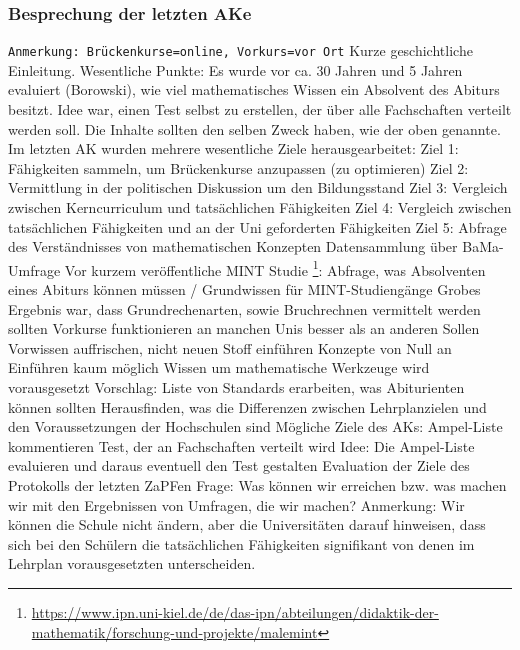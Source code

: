 \subsubsection*{Besprechung der letzten AKe}
\begin{outline}
\1 \texttt{Anmerkung: Brückenkurse=online, Vorkurs=vor Ort}
\1 Kurze geschichtliche Einleitung. Wesentliche Punkte:
\2 Es wurde vor ca. 30 Jahren und 5 Jahren evaluiert (Borowski), wie viel mathematisches Wissen ein Absolvent des Abiturs besitzt.
\2 Idee war, einen Test selbst zu erstellen, der über alle Fachschaften verteilt werden soll. Die Inhalte sollten den selben Zweck haben, wie der oben genannte.
\2 Im letzten AK wurden mehrere wesentliche Ziele herausgearbeitet:
\3 Ziel 1: Fähigkeiten sammeln, um Brückenkurse anzupassen (zu optimieren)
\3 Ziel 2: Vermittlung in der politischen Diskussion um den Bildungsstand
\3 Ziel 3: Vergleich zwischen Kerncurriculum und tatsächlichen Fähigkeiten
\3 Ziel 4: Vergleich zwischen tatsächlichen Fähigkeiten und an der Uni geforderten Fähigkeiten
\3 Ziel 5: Abfrage des Verständnisses von mathematischen Konzepten
\1 Datensammlung über BaMa-Umfrage
				\1 Vor kurzem veröffentliche MINT Studie \footnote{\url{https://www.ipn.uni-kiel.de/de/das-ipn/abteilungen/didaktik-der-mathematik/forschung-und-projekte/malemint}}:
					\2 Abfrage, was Absolventen eines Abiturs können müssen / Grundwissen für MINT-Studiengänge
					\2 Grobes Ergebnis war, dass Grundrechenarten, sowie Bruchrechnen vermittelt werden sollten
				\1 Vorkurse funktionieren an manchen Unis besser als an anderen
					\2 Sollen Vorwissen auffrischen, nicht neuen Stoff einführen
					\2 Konzepte von Null an Einführen kaum möglich
					\2 Wissen um mathematische Werkzeuge wird vorausgesetzt
				\1 Vorschlag: Liste von Standards erarbeiten, was Abiturienten können sollten
				\1 Herausfinden, was die Differenzen zwischen Lehrplanzielen und den Voraussetzungen der Hochschulen sind
				\1 Mögliche Ziele des AKs:
					\2 Ampel-Liste kommentieren
					\2 \flqq Test\frqq, der an Fachschaften verteilt wird
				\1 Idee: Die Ampel-Liste evaluieren und daraus eventuell den Test gestalten
				\1 Evaluation der Ziele des Protokolls der letzten ZaPFen
				\1 Frage: Was können wir erreichen bzw. was machen wir mit den Ergebnissen von Umfragen, die wir machen?
				\1 Anmerkung: Wir können die Schule nicht ändern, aber die Universitäten darauf hinweisen, dass sich bei den Schülern die tatsächlichen Fähigkeiten signifikant von denen im Lehrplan vorausgesetzten unterscheiden.
			\end{outline}


